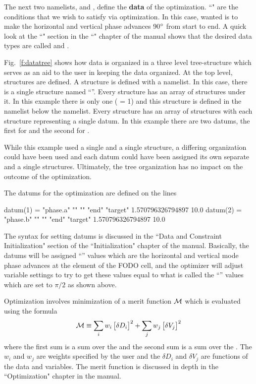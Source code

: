 \documentclass{hitec}     %
\begin{document}
 The next two namelists,  and , define the \textbf{data} of the optimization. ``" are the conditions that we wish to satisfy via optimization. 
In this case, wanted is to make the horizontal and vertical phase advances 90$\degree$ from start to end. 
A quick look at the ``" section in the ``" chapter of the \tao manual shows that 
the desired data types are called  and . 

Fig.~\ref{f:datatree} shows how data is organized in a three level tree-structure which
serves as an aid to the user in keeping the data organized. 
At the top level,  structures are defined.
A  structure is defined with a  namelist.
In this case, there is a single  structure named ``''.
Every  structure has an array of  structures under it. In this example there is only one
( = 1) and this  structure is defined in the  namelist below the 
namelist. Every  structure has an array of  structures with each  structure representing
a single datum. In this example there are two datums, the first for  and the second for .

While this example used a single  and a single  structure, a differing organization could
have been used and each datum could have been assigned its own separate  and a single  structures.
Ultimately, the tree organization has no impact on the outcome of the optimization. 

The datums for the optimization are defined on the lines
\begin{code}
datum(1) = "phase.a" "" "" "end" "target" 1.570796326794897 10.0
datum(2) = "phase.b" "" "" "end" "target" 1.570796326794897 10.0
\end{code}
The syntax for setting datums is discussed in the ``Data and Constraint Initialization" section of the ``Initialization" chapter of the \tao manual. 
Basically, the datums will be assigned  ``'' values which are the horizontal and vertical mode phase advances at the  element of the FODO cell, and the optimizer will adjust variable settings to try to get these  values equal to what is called the ``'' values which are set to $\pi/2$ as shown above. 

Optimization involves minimization of a merit function  $\cal M$ which is evaluated
using the formula
\begin{equation}
  {\cal M} \equiv 
    \sum_{i} w_i \, \bigl[ \delta D_i \bigr]^2 + 
    \sum_{j} w_j \, \bigl[ \delta V_j \bigr]^2
  \label{m1}
\end{equation}
where the first sum is a sum over the  and the second sum is a sum over the . 
The $w_i$ and $w_j$ are weights specified by the user and the $\delta D_i$ and
$\delta V_j$ are functions of the data and variables. The merit function is discussed in depth in
the ``Optimization" chapter in the \tao manual.
\end{document}
